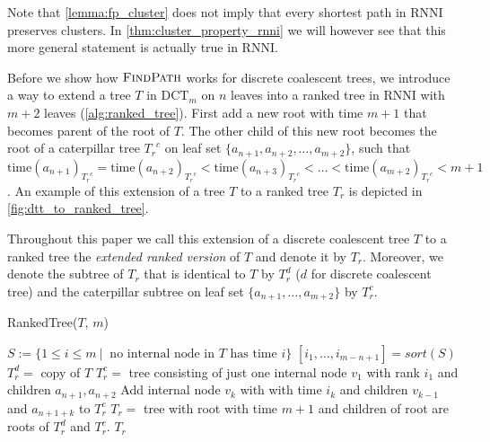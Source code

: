 \documentclass[11pt]{amsart}
\newcommand{\rnni}{\mathrm{RNNI}}
\newcommand{\findpath}{\textsc{FindPath}}
\newcommand{\ntime}{\mathrm{time}}
\newcommand{\dct}{\mathrm{DCT}}
\newcommand{\summary}[1]{} %
\providecommand{\DIFaddtex}[1]{{\protect\color{blue}\uwave{#1}}} %
\providecommand{\DIFaddbegin}{} %
\providecommand{\DIFaddend}{} %
\providecommand{\DIFadd}[1]{\texorpdfstring{\DIFaddtex{#1}}{#1}} %
\newcommand{\DIFaddincludegraphics}[2][]{{\color{blue}\fbox{\DIFOincludegraphics[#1]{#2}}}} %
\DeclareRobustCommand{\DIFaddbegin}{\DIFOaddbegin \let\includegraphics\DIFaddincludegraphics} %
\DeclareRobustCommand{\DIFaddend}{\DIFOaddend \let\includegraphics\DIFOincludegraphics} %
\begin{document}
Note that \autoref{lemma:fp_cluster} does not imply that every shortest path in $\rnni$ preserves clusters.
In \autoref{thm:cluster_property_rnni} we will however see that this more general statement is actually true in $\rnni$.

\summary{How to add leaves to a $\dct_m$ tree to transform it into a ranked tree}
Before we show how $\findpath$ works for discrete coalescent trees, we introduce a way to extend a tree $T$ in $\dct_m$ on $n$ leaves into a ranked tree in $\rnni$ with $m+2$ leaves (\autoref{alg:ranked_tree}).
First add a new root with time $m + 1$ that becomes \DIFaddbegin \DIFadd{the }\DIFaddend parent of the root of $T$.
The other child of this new root becomes the root of a caterpillar tree ${T_r}^c$ on leaf set $\{a_{n+1}, a_{n+2}, \ldots, a_{m+2}\}$, such that $\ntime(a_{n+1})_{{T_r}^c} = \ntime(a_{n+2})_{{T_r}^c} < \ntime(a_{n+3})_{{T_r}^c} < \ldots < \ntime(a_{m+2})_{{T_r}^c} < m+1$.
An example of this extension of a tree $T$ to a ranked tree $T_r$ is depicted in \autoref{fig:dtt_to_ranked_tree}.

Throughout this paper we call this extension of a discrete coalescent tree $T$ to a ranked tree the \emph{extended ranked version} of $T$ and denote it by $T_r$.
Moreover, we denote the subtree of $T_r$ that is identical to $T$ by $T_r^d$ ($d$ for discrete coalescent tree) and the caterpillar subtree on leaf set $\{a_{n+1}, \ldots, a_{m+2}\}$ by $T_r^c$.

\begin{algorithm}[ht]
	\caption{RankedTree($T$, $m$)}
	\label{alg:ranked_tree}
	\begin{algorithmic}[1]
		\STATE $S:= \{1 \leq i \leq m \ |\  \text{ no internal node in } T \text{ has time } i\}$
		\STATE $[i_1, \ldots, i_{m-n+1}] = sort(S)$
		\STATE $T_r^d =$ copy of $T$
		\STATE $T_r^c =$ tree consisting of just one internal node $v_1$ with rank $i_1$ and children $a_{n+1}, a_{n+2}$
			\STATE Add internal node $v_k$ with with time $i_k$ and children $v_{k-1}$ and $a_{n+1+k}$ to $T_r^c$
		\ENDFOR
		\STATE $T_r = $ tree with root with time $m+1$ and children of root are roots of $T_r^d$ and $T_r^c$.
		\RETURN $T_r$
	\end{algorithmic}
\end{algorithm}
\end{document}
